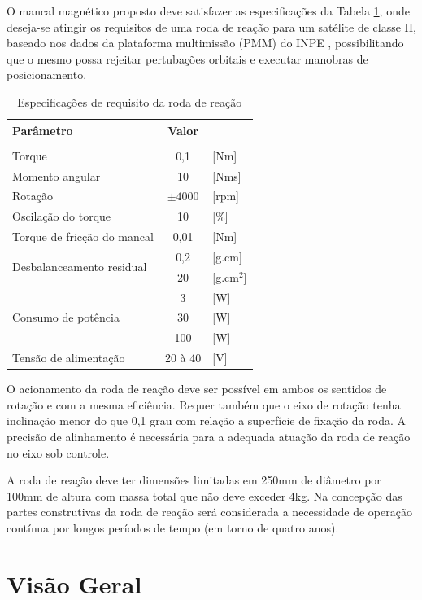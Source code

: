 O mancal magnético proposto deve satisfazer as especificações da Tabela \ref{tab:PMM:especificações}, onde deseja-se atingir os requisitos de uma roda de reação para um satélite de classe II, baseado nos dados da plataforma multimissão (PMM) do INPE \citep{Veloso2009}, possibilitando que o mesmo possa rejeitar pertubações orbitais e executar manobras de posicionamento. 

\begin{table}[!ht]
    \centering
    \begin{tabular}{l c l }
		Parâmetro & Valor &   \\
       	\hline \\
 		Torque   						  & 0,1 & [Nm]  \\
 		Momento angular  				  & 10 &      [Nms] \\
 		Rotação 							  & $\pm4000$ & [rpm] \\
 		Oscilação do torque 				  & 10  & [\%] \\
 		Torque de fricção do mancal 		  & 0,01 & [Nm] \\
 		\multirow{2}{*}{Desbalanceamento residual} & 0,2 & [g.cm]\\
 		 & 20  & [g.cm$^{2}$]  \\
 		\multirow{3}{*}{Consumo de potência} 
 		& 3 & [W] 	 \\
 		& 30 & [W] \\
 		& 100 & [W] 	\\	
 		Tensão de alimentação  & 20 à 40 & [V]  \\
    \end{tabular}
    \caption{Especificações de requisito da roda de reação}
    \label{tab:PMM:especificações}
\end{table}

O acionamento da roda de reação deve ser possível em ambos os sentidos de rotação e com a mesma eficiência. Requer também que o eixo de rotação tenha inclinação menor do que 0,1 grau com relação a superfície de fixação da roda. A precisão de alinhamento é necessária para a adequada atuação da roda de reação no eixo sob controle.

A roda de reação deve ter dimensões limitadas em 250mm de diâmetro por 100mm de altura com massa total que não deve exceder 4kg. Na concepção das partes construtivas da roda de reação será considerada a necessidade de operação contínua por longos períodos de tempo (em torno de quatro anos).

\section{Visão Geral}

